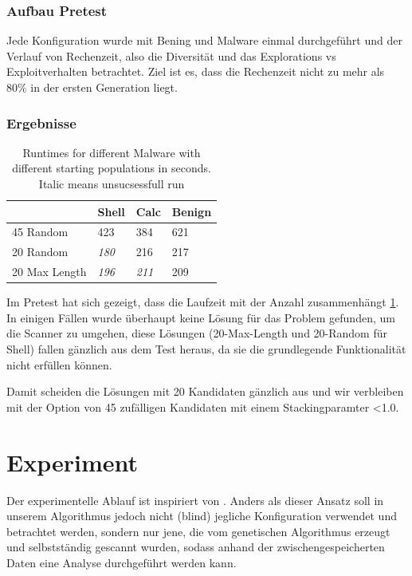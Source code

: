 \subsubsection{Aufbau Pretest}
Jede Konfiguration wurde mit Bening und Malware einmal durchgeführt und der Verlauf von Rechenzeit, also die Diversität und das Explorations vs Exploitverhalten betrachtet. Ziel ist es, dass die Rechenzeit nicht zu mehr als 80\% in der ersten Generation liegt.
\subsubsection{Ergebnisse}
\begin{table}[]
\begin{tabular}{@{}llll@{}}
\toprule
              & Shell        & Calc & Benign \\ \midrule
45 Random     & 423          & 384  & 621    \\
20 Random     & \textit{180} & 216  & 217    \\
20 Max Length & \textit{196} & \textit{211}  & 209    \\ \bottomrule
\end{tabular}
\caption{Runtimes for different Malware with different starting populations in seconds. Italic means unsucsessfull run}
\label{Pretest_Inital}
\end{table}
Im Pretest hat sich gezeigt, dass die Laufzeit mit der Anzahl zusammenhängt \ref{Pretest_Inital}. In einigen Fällen wurde überhaupt keine Lösung für das Problem gefunden, um die Scanner zu umgehen, diese Lösungen (20-Max-Length und 20-Random für Shell) fallen gänzlich aus dem Test heraus, da sie die grundlegende Funktionalität nicht erfüllen können.

Damit scheiden die Lösungen mit 20 Kandidaten gänzlich aus und wir verbleiben mit der Option von 45 zufälligen Kandidaten mit einem Stackingparamter <1.0.


\section{Experiment}
\label{Experiment}
Der experimentelle Ablauf ist inspiriert von \cite{holm_2023_hide}. 
Anders als dieser Ansatz soll in unserem Algorithmus jedoch nicht (blind) jegliche Konfiguration verwendet und betrachtet werden, sondern nur jene, die vom genetischen Algorithmus erzeugt und selbstständig gescannt wurden, sodass anhand der zwischengespeicherten Daten eine Analyse durchgeführt werden kann.

